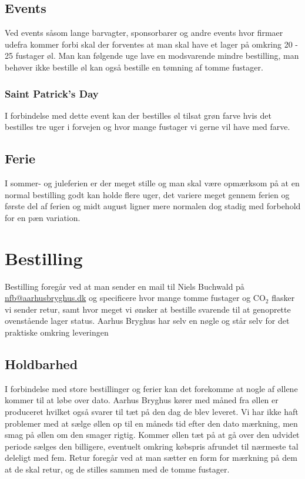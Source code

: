 \subsection{Events}

Ved events såsom lange barvagter, sponsorbarer og andre events hvor firmaer udefra kommer forbi skal der forventes
at man skal have et lager på omkring 20 - 25 fustager øl. Man kan følgende uge lave en modsvarende mindre bestilling,
man behøver ikke bestille øl kan også bestille en tømning af tomme fustager.

\subsubsection{Saint Patrick's Day}

I forbindelse med dette event kan der bestilles øl tilsat grøn farve hvis det bestilles tre uger i forvejen og hvor mange
fustager vi gerne vil have med farve.

\subsection{Ferie}

I sommer- og juleferien er der meget stille og man skal være opmærksom på at en normal bestilling
godt kan holde flere uger, det variere meget gennem ferien og første del af ferien og
midt august ligner mere normalen dog stadig med forbehold for en pæn variation.


\section{Bestilling}

Bestilling foregår ved at man sender en mail til Niels Buchwald på \\
\href{mailto:nfb@aarhusbryghus.dk}{nfb@aarhusbryghus.dk} og specificere hvor mange tomme fustager
og CO$_{2}$ flasker vi sender retur, samt hvor meget vi ønsker at bestille svarende til at genoprette
ovenstående lager status. Aarhus Bryghus har selv en nøgle og står selv for det praktiske omkring leveringen

\subsection{Holdbarhed}

I forbindelse med store bestillinger og ferier kan det forekomme at nogle af øllene kommer til at løbe over dato.
Aarhus Bryghus kører med måned fra øllen er produceret hvilket også svarer til tæt på den dag de blev leveret.
Vi har ikke haft problemer med at sælge øllen op til en måneds tid efter den dato mærkning, men smag på øllen
om den smager rigtig. Kommer øllen tæt på at gå over den udvidet periode sælges den billigere,
eventuelt omkring købspris afrundet til nærmeste tal deleligt med fem.
Retur foregår ved at man sætter en form for mærkning på dem at de skal retur, og de stilles sammen
med de tomme fustager.

